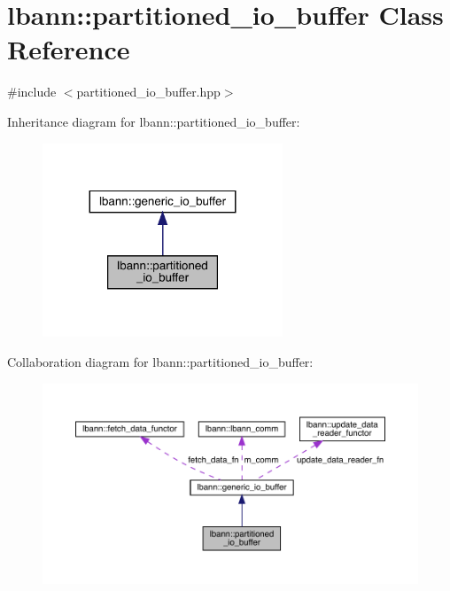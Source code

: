 \hypertarget{classlbann_1_1partitioned__io__buffer}{}\section{lbann\+:\+:partitioned\+\_\+io\+\_\+buffer Class Reference}
\label{classlbann_1_1partitioned__io__buffer}


{\ttfamily \#include $<$partitioned\+\_\+io\+\_\+buffer.\+hpp$>$}



Inheritance diagram for lbann\+:\+:partitioned\+\_\+io\+\_\+buffer\+:\nopagebreak
\begin{figure}[H]
\begin{center}
\leavevmode
\includegraphics[width=203pt]{classlbann_1_1partitioned__io__buffer__inherit__graph}
\end{center}
\end{figure}


Collaboration diagram for lbann\+:\+:partitioned\+\_\+io\+\_\+buffer\+:\nopagebreak
\begin{figure}[H]
\begin{center}
\leavevmode
\includegraphics[width=350pt]{classlbann_1_1partitioned__io__buffer__coll__graph}
\end{center}
\end{figure}
